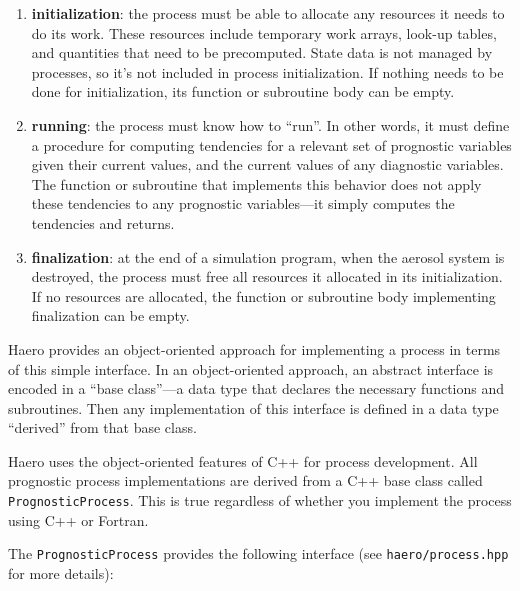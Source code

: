 \begin{enumerate}
  \item {\bf initialization}: the process must be able to allocate any resources
        it needs to do its work. These resources include temporary work arrays,
        look-up tables, and quantities that need to be precomputed. State data
        is not managed by processes, so it's not included in process
        initialization. If nothing needs to be done for initialization, its
        function or subroutine body can be empty.
  \item {\bf running}: the process must know how to ``run''. In other words, it
        must define a procedure for computing tendencies for a relevant set of
        prognostic variables given their current values, and the current values
        of any diagnostic variables. The function or subroutine that implements
        this behavior does not apply these tendencies to any prognostic
        variables---it simply computes the tendencies and returns.
  \item {\bf finalization}: at the end of a simulation program, when the aerosol
        system is destroyed, the process must free all resources it allocated
        in its initialization. If no resources are allocated, the function or
        subroutine body implementing finalization can be empty.
\end{enumerate}

Haero provides an object-oriented approach for implementing a process in terms
of this simple interface. In an object-oriented approach, an abstract interface
is encoded in a ``base class''---a data type that declares the necessary
functions and subroutines. Then any implementation of this interface is defined
in a data type ``derived'' from that base class.

Haero uses the object-oriented features of C++ for process development. All
prognostic process implementations are derived from a C++ base class called
\texttt{PrognosticProcess}. This is true regardless of whether you implement the
process using C++ or Fortran.

The \texttt{PrognosticProcess} provides the following interface (see
\texttt{haero/process.hpp} for more details):

